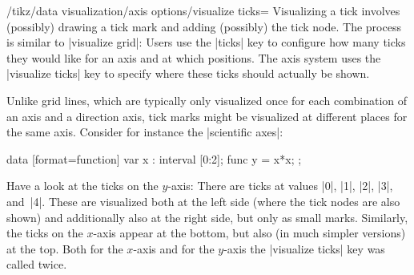 \begin{key}{/tikz/data visualization/axis options/visualize ticks=}
    Visualizing a tick involves (possibly) drawing a tick mark and adding
    (possibly) the tick node. The process is similar to |visualize grid|: Users
    use the |ticks| key to configure how many ticks they would like for an axis
    and at which positions. The axis system uses the |visualize ticks| key to
    specify where these ticks should actually be shown.

    Unlike grid lines, which are typically only visualized once for each
    combination of an axis and a direction axis, tick marks might be visualized
    at different places for the same axis. Consider for instance the
    |scientific axes|:
\begin{codeexample}[preamble={\usetikzlibrary{datavisualization.formats.functions}}]
\tikz \datavisualization [scientific axes, all axes={length=3cm},
                          x axis={ticks={stack}},
                          visualize as smooth line]
  data [format=function] {
    var x : interval [0:2];
    func y = \value  x*\value x;
  };
\end{codeexample}
    Have a look at the ticks on the $y$-axis: There are ticks at values |0|,
    |1|, |2|, |3|, and~|4|. These are visualized both at the left side (where
    the tick nodes are also shown) and additionally also at the right side, but
    only as small marks. Similarly, the ticks on the $x$-axis appear at the
    bottom, but also (in much simpler versions) at the top. Both for the
    $x$-axis and for the $y$-axis the |visualize ticks| key was called twice.



\end{key}
